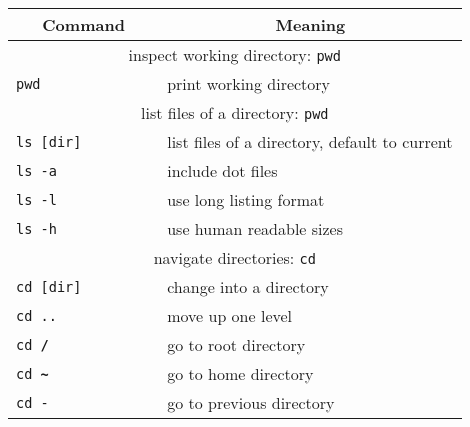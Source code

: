 \documentclass[landscape,a0paper,fontscale=0.285]{baposter} %
\begin{document}
\begin{poster}
{\begin{tabular}{p{0.3\linewidth}p{0.6\linewidth}}
\multicolumn{1}{c}{\textbf{Command}} & \multicolumn{1}{c}{\textbf{Meaning}} \\
\hline
\multicolumn{2}{c}{inspect working directory: \small{\texttt{pwd}}} \\
\hline
\texttt{\small{pwd}} & print working directory \\
\hline
\multicolumn{2}{c}{list files of a directory: \small{\texttt{pwd}}} \\
\hline
\texttt{\small{ls [dir]}} & list files of a directory, default to current \\
\texttt{\small{ls -a}} & include dot files \\
\texttt{\small{ls -l}} & use long listing format \\
\texttt{\small{ls -h}} & use human readable sizes \\
\hline
\multicolumn{2}{c}{navigate directories: \small{\texttt{cd}}} \\
\hline
\texttt{\small{cd [dir]}} & change into a directory \\
\texttt{\small{cd ..}} & move up one level \\
\texttt{\small{cd  \textbf{/} }} & go to root directory \\
\texttt{\small{cd  \textbf{\textasciitilde} }} & go to home directory \\
\texttt{\small{cd   -}} & go to previous directory \\
\end{tabular}


}






\end{poster}
\end{document}
